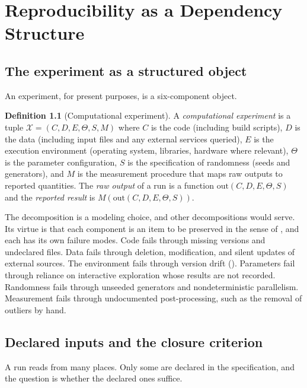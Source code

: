 \documentclass[11pt,twoside,openright]{book}
\theoremstyle{plain}
\theoremstyle{definition}
\newtheorem{definition}[theorem]{Definition}
\theoremstyle{remark}
\begin{document}
\chapter{Reproducibility as a Dependency Structure}\label{ch:reproducibility}

\section{The experiment as a structured object}

An experiment, for present purposes, is a six-component object.

\begin{definition}[Computational experiment]\label{def:experiment}
A \emph{computational experiment} is a tuple $\mathcal{X}=(C,D,E,\Theta,S,M)$ where $C$ is the code (including build scripts), $D$ is the data (including input files and any external services queried), $E$ is the execution environment (operating system, libraries, hardware where relevant), $\Theta$ is the parameter configuration, $S$ is the specification of randomness (seeds and generators), and $M$ is the measurement procedure that maps raw outputs to reported quantities. The \emph{raw output} of a run is a function $\mathrm{out}(C,D,E,\Theta,S)$ and the \emph{reported result} is $M(\mathrm{out}(C,D,E,\Theta,S))$.
\end{definition}

The decomposition is a modeling choice, and other decompositions would serve. Its virtue is that each component is an item to be preserved in the sense of , and each has its own failure modes. Code fails through missing versions and undeclared files. Data fails through deletion, modification, and silent updates of external sources. The environment fails through version drift (). Parameters fail through reliance on interactive exploration whose results are not recorded. Randomness fails through unseeded generators and nondeterministic parallelism. Measurement fails through undocumented post-processing, such as the removal of outliers by hand.

\section{Declared inputs and the closure criterion}

A run reads from many places. Only some are declared in the specification, and the question is whether the declared ones suffice.
\end{document}
